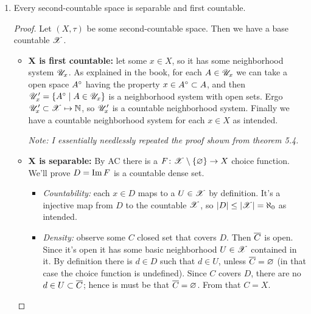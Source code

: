 \documentclass[a4paper]{article}
\begin{document}
\begin{enumerate}
\begin{proof}
			We found a base $\XX$ that has one-to-one mapping into $D \times \Q$, which is countable because $D$ is countable and $\Q$ is countable, and $\az^{2} = \az$. Finally $\XX$ is a countable base for $(X, \rho)$, so $(X, \rho)$ is second-countable. 
		\end{proof}
		\item Every second-countable space is separable and first countable. \begin{proof}Let $(X, \tau)$ be some second-countable space. Then we have a base countable $\XX$. 
			\begin{itemize}
				\item \textbf{$\bm X$ is first countable: }let some $x \in X$, so it has some neighborhood system $\mathscr{U}_x$. As explained in the book, for each $A \in \mathscr{U}_x$ we can take a open space $A^{\circ}$ having the property $x \in A^{\circ} \subset A$, and then $\mathscr{U}_x' = \{A^{\circ} \mid A \in \mathscr{U}_x\}$ is a neighborhood system with open sets. Ergo $\mathscr{U}_x' \subset \mathscr{X} \mapsto \mathbb{N}$, so $\mathscr{U}_x'$ is a countable neighborhood system. Finally we have a countable neighborhood system for each $x \in X$ as intended. 
				
				\textit{Note: I essentially needlessly repeated the proof shown from theorem 5.4. }
				\item \textbf{$\bm X$ is separable: }By AC there is a $F \colon \mathscr{X} \setminus \{\varnothing\} \to X$ choice function. We'll prove $D = \operatorname{Im} F$ is a countable dense set. 
				\begin{itemize}
					\item \textit{Countability: }each $x \in D$ maps to a $U \in \mathscr{X}$ by definition. It's a injective map from $D$ to the countable $\XX$, so $\left \lvert D \right \rvert \le \left \lvert \mathscr{X} \right \rvert = \aleph_0$ as intended. 
					\item \textit{Density: }observe some $C$ closed set that covers $D$. Then $\overline{C}$ is open. Since it's open it has some basic neighborhood $U \in \mathscr{X}$ contained in it. By definition there is $d \in D$ such that $d \in U$, unless $\overline C = \varnothing$ (in that case the choice function is undefined). Since $C$ covers $D$, there are no $d \in U \subset \overline C$; hence is must be that $\overline C = \varnothing$. From that $C = X$. 
					

\end{itemize}
\end{itemize}
\end{proof}
\end{enumerate}
\end{document}
